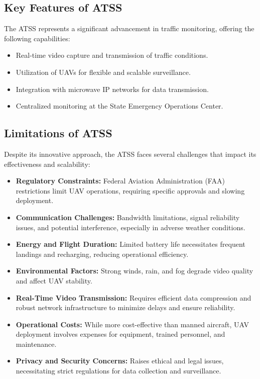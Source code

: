 \subsection{Key Features of ATSS}
The ATSS represents a significant advancement in traffic monitoring, offering the following capabilities:
\begin{itemize}
    \item Real-time video capture and transmission of traffic conditions.
    \item Utilization of UAVs for flexible and scalable surveillance.
    \item Integration with microwave IP networks for data transmission.
    \item Centralized monitoring at the State Emergency Operations Center.
\end{itemize}

\subsection{Limitations of ATSS}
Despite its innovative approach, the ATSS faces several challenges that impact its effectiveness and scalability:
\begin{itemize}
    \item \textbf{Regulatory Constraints:} Federal Aviation Administration (FAA) restrictions limit UAV operations, requiring specific approvals and slowing deployment.
    \item \textbf{Communication Challenges:} Bandwidth limitations, signal reliability issues, and potential interference, especially in adverse weather conditions.
    \item \textbf{Energy and Flight Duration:} Limited battery life necessitates frequent landings and recharging, reducing operational efficiency.
    \item \textbf{Environmental Factors:} Strong winds, rain, and fog degrade video quality and affect UAV stability.
    \item \textbf{Real-Time Video Transmission:} Requires efficient data compression and robust network infrastructure to minimize delays and ensure reliability.
    \item \textbf{Operational Costs:} While more cost-effective than manned aircraft, UAV deployment involves expenses for equipment, trained personnel, and maintenance.
    \item \textbf{Privacy and Security Concerns:} Raises ethical and legal issues, necessitating strict regulations for data collection and surveillance.
\end{itemize}

